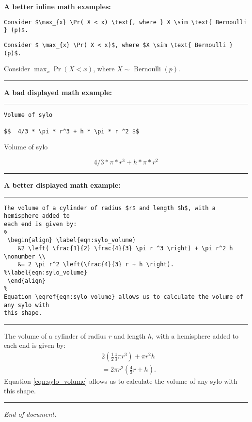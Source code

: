 \documentclass[a4paper, 11pt]{article}
\begin{document}
\textbf{A better inline math examples:}

\verb|Consider $\max_{x} \Pr( X < x) \text{, where } X \sim \text{ Bernoulli } (p)$.|

\verb|Consider $ \max_{x} \Pr( X < x)$, where $X \sim \text{ Bernoulli } (p)$.|

Consider $ \max_{x} \Pr( X < x)$, where $X \sim \text{ Bernoulli } (p)$.

\vspace{1em}
\hrule
\vspace{1em}

\textbf{A bad  displayed math example:}

\vspace{1em}
\hrule
\vspace{1em}

\begin{verbatim}
Volume of sylo

$$  4/3 * \pi * r^3 + h * \pi * r ^2 $$
\end{verbatim}

Volume of sylo

$$  4/3 * \pi * r^3 + h * \pi * r ^2 $$ 

\vspace{1em}
\hrule
\vspace{1em}

\textbf{A better displayed math example:}

\vspace{1em}
\hrule
\vspace{1em}

\begin{verbatim}
The volume of a cylinder of radius $r$ and length $h$, with a hemisphere added to 
each end is given by: 
%
 \begin{align} \label{eqn:sylo_volume}
    &2 \left( \frac{1}{2} \frac{4}{3} \pi r ^3 \right) + \pi r^2 h \nonumber \\
    &= 2 \pi r^2 \left(\frac{4}{3} r + h \right). %\label{eqn:sylo_volume}
 \end{align}
%
Equation \eqref{eqn:sylo_volume} allows us to calculate the volume of any sylo with
this shape.  
\end{verbatim}

\vspace{1em}
\hrule
\vspace{1em}

The volume of a cylinder of radius $r$ and length $h$, with a hemisphere added to each end is given by: 
%
\begin{align} \label{eqn:sylo_volume}
    &2 \left( \frac{1}{2} \frac{4}{3} \pi r ^3 \right) + \pi r^2 h \nonumber \\
    &= 2 \pi r^2 \left(\frac{4}{3} r + h \right). %
\end{align}
%
Equation \eqref{eqn:sylo_volume} allows us to calculate the volume of any sylo with this shape. 


\vspace{1em}
\hrule
\vspace{1em}

\hfill \textit{End of document.}
\end{document}
